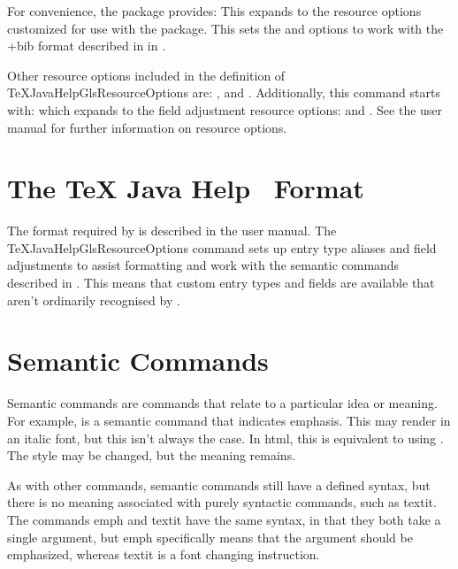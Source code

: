 \documentclass[toc=listof]{scrreport}
\newcommand{\TeXJavaHelp}{\texorpdfstring{\TeX}{TeX} Java Help}
\begin{document}
For convenience, the  package provides:
This expands to the resource options customized for use with the
 package. This sets the 
and  options to work with the \ext+{bib} format described in
in .

Other resource options included in the definition of
\gls{TeXJavaHelpGlsResourceOptions}
are: ,  and . Additionally, this command
starts with:
which expands to the field adjustment resource options: 
 and .
See the  user manual for further information on resource options.

\section{The \TeXJavaHelp\  Format}
\label{sec:bibformat}

The  format required by  is described in the
 user manual. The \gls{TeXJavaHelpGlsResourceOptions} command
sets up entry type aliases and field adjustments to assist formatting and work
with the semantic commands described in .
This means that custom entry types and fields are available that aren't
ordinarily recognised by .

\section{Semantic Commands}
\label{sec:semanticcmds}

Semantic commands are commands that relate to a particular idea or meaning.
For example,  is a semantic command that indicates
emphasis. This may render  in an italic font, but this isn't always the
case. In \gls{html}, this is equivalent to using
.
The style may be changed, but the meaning remains.

As with other commands, semantic commands still have a defined syntax, but
there is no meaning associated with purely syntactic commands, such as
\gls{textit}. The commands \gls{emph} and \gls{textit} have the same syntax, in that
they both take a single argument, but \gls{emph} specifically means that the
argument should be emphasized, whereas \gls{textit} is a font changing
instruction.
\end{document}
